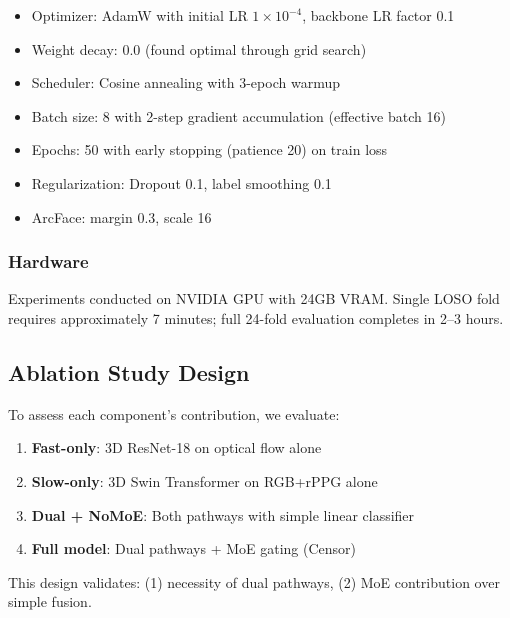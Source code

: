 \begin{itemize}
\item Optimizer: AdamW with initial LR $1 \times 10^{-4}$, backbone LR factor 0.1
\item Weight decay: 0.0 (found optimal through grid search)
\item Scheduler: Cosine annealing with 3-epoch warmup
\item Batch size: 8 with 2-step gradient accumulation (effective batch 16)
\item Epochs: 50 with early stopping (patience 20) on train loss
\item Regularization: Dropout 0.1, label smoothing 0.1
\item ArcFace: margin 0.3, scale 16
\end{itemize}

\subsubsection{Hardware}

Experiments conducted on NVIDIA GPU with 24GB VRAM. Single LOSO fold requires approximately 7 minutes; full 24-fold evaluation completes in 2--3 hours.

\subsection{Ablation Study Design}

To assess each component's contribution, we evaluate:
\begin{enumerate}
\item \textbf{Fast-only}: 3D ResNet-18 on optical flow alone
\item \textbf{Slow-only}: 3D Swin Transformer on RGB+rPPG alone
\item \textbf{Dual + NoMoE}: Both pathways with simple linear classifier
\item \textbf{Full model}: Dual pathways + MoE gating (Censor)
\end{enumerate}

This design validates: (1) necessity of dual pathways, (2) MoE contribution over simple fusion.